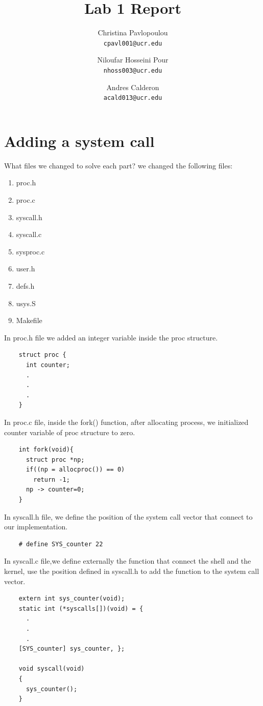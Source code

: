 \documentclass[10pt]{scrartcl}
\title{Lab 1 Report}
\author{
   Christina Pavlopoulou\\
  \small \texttt{cpavl001@ucr.edu}
  \and
   Niloufar Hosseini Pour\\
  \small \texttt{nhoss003@ucr.edu}
  \and
   Andres Calderon\\
  \small \texttt{acald013@ucr.edu}
}
\begin{document}
\maketitle

\section{Adding a system call}\label{sec:sc}
What files we changed to solve each part?
we changed the following files:
\begin{enumerate}
 \item proc.h
 \item proc.c
 \item syscall.h
 \item syscall.c
 \item sysproc.c 
 \item user.h
 \item defs.h
 \item usys.S
 \item Makefile
\end{enumerate}

In proc.h file we added an integer variable inside the proc structure.

 \begin{verbatim}
    struct proc {
      int counter;
      .
      .
      .
    }
\end{verbatim}

In proc.c file, inside the fork() function, after allocating process, we initialized counter variable of proc structure to zero.
 \begin{verbatim}
    int fork(void){
      struct proc *np;
      if((np = allocproc()) == 0)
        return -1;
      np -> counter=0;
    }
\end{verbatim}

In syscall.h file, we define the position of the system call vector that connect to our implementation.
 \begin{verbatim}
    # define SYS_counter 22
\end{verbatim}

In syscall.c file,we define externally the function that connect the shell and the kernel, use the position defined in syscall.h to add the function to the system call vector.
 \begin{verbatim}
    extern int sys_counter(void);
    static int (*syscalls[])(void) = {
      .
      .
      .
    [SYS_counter] sys_counter, };
    
    void syscall(void)
    {
      sys_counter();
    }
\end{verbatim}
\end{document}
